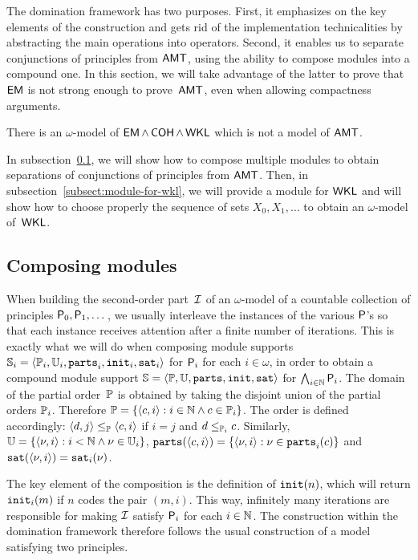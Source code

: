 
The domination framework has two purposes. First, it emphasizes on the key elements
of the construction and gets rid of the implementation technicalities by abstracting 
the main operations into operators. Second, it enables us to separate conjunctions
of principles from $\operatorname{\sf{AMT}}$, using the ability to compose modules into a compound one.
In this section, we will take advantage of the latter to prove that $\operatorname{\sf{EM}}$
is not strong enough to prove~$\operatorname{\sf{AMT}}$, even when allowing compactness arguments.

\begin{theorem}\label{thm:emo-coh-amt}
There is an $\omega$-model of $\operatorname{\sf{EM}} \wedge \operatorname{\sf{COH}} \wedge \operatorname{\sf{WKL}}$ which
is not a model of $\operatorname{\sf{AMT}}$.
\end{theorem}

In subsection~\ref{subsect:composing-modules}, we will show how to compose multiple modules to obtain
separations of conjunctions of principles from $\operatorname{\sf{AMT}}$. Then, in subsection~\ref{subsect:module-for-wkl}, we will
provide a module for $\operatorname{\sf{WKL}}$ and will show how to choose properly the sequence
of sets $X_0, X_1, \dots$ to obtain an $\omega$-model of~$\operatorname{\sf{WKL}}$. 

\subsection{Composing modules}\label{subsect:composing-modules}

When building the second-order part~$\mathcal{I}$ of an $\omega$-model of a countable collection of principles $\mathsf{P}_0, \mathsf{P}_1, \dots$,
we usually interleave the instances of the various $\mathsf{P}$'s so that each instance receives attention after a finite number of iterations.
This is exactly what we will do when composing module supports $\mathbb{S}_i = \left\langle \mathbb{P}_i, \mathbb{U}_i, \mathtt{parts}_i, \mathtt{init}_i, \mathtt{sat}_i \right\rangle$
for $\mathsf{P}_i$ for each $i \in \omega$, in order to obtain a compound 
module support $\mathbb{S} = \left\langle \mathbb{P}, \mathbb{U}, \mathtt{parts}, \mathtt{init}, \mathtt{sat} \right\rangle$ for $\bigwedge_{i \in \mathbb{N}} \mathsf{P}_i$.
The domain of the partial order~$\mathbb{P}$ is obtained by taking the disjoint union of the partial orders $\mathbb{P}_i$.
Therefore $\mathbb{P} = \{ \left\langle c,i \right\rangle : i \in \mathbb{N} \wedge c \in \mathbb{P}_i \}$.
The order is defined accordingly: $\left\langle d, j \right\rangle \leq_{\mathbb{P}} \left\langle c,i \right\rangle$ if $i = j$
and $d \leq_{\mathbb{P}_i} c$. Similarly, $\mathbb{U} = \{ \left\langle \nu,i \right\rangle : i < \mathbb{N} \wedge \nu \in \mathbb{U}_i \}$,
$\mathtt{parts}(\left\langle c,i \right\rangle) = \{\left\langle \nu, i \right\rangle : \nu \in \mathtt{parts}_i(c)\}$ and $\mathtt{sat}(\left\langle \nu,i \right\rangle) = \mathtt{sat}_i(\nu)$.

The key element of the composition is the definition of $\mathtt{init}(n)$, which will
return $\mathtt{init}_i(m)$ if $n$ codes the pair $(m, i)$.
This way, infinitely many iterations are responsible for making $\mathcal{I}$ satisfy $\mathsf{P}_i$ for each $i \in \mathbb{N}$.
The construction within the domination framework therefore follows the usual construction of a model satisfying two principles.

